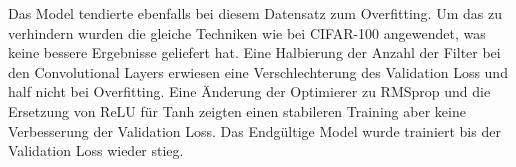 Das Model tendierte ebenfalls bei diesem Datensatz zum Overfitting. Um das zu verhindern wurden die gleiche Techniken wie bei CIFAR-100
angewendet, was keine bessere Ergebnisse geliefert hat. Eine Halbierung der Anzahl der Filter bei den Convolutional Layers erwiesen eine Verschlechterung
des Validation Loss und half nicht bei Overfitting. Eine Änderung der Optimierer zu RMSprop und die Ersetzung von ReLU für Tanh zeigten
einen stabileren Training aber keine Verbesserung der Validation Loss. Das Endgültige Model wurde trainiert bis der Validation Loss wieder stieg.
